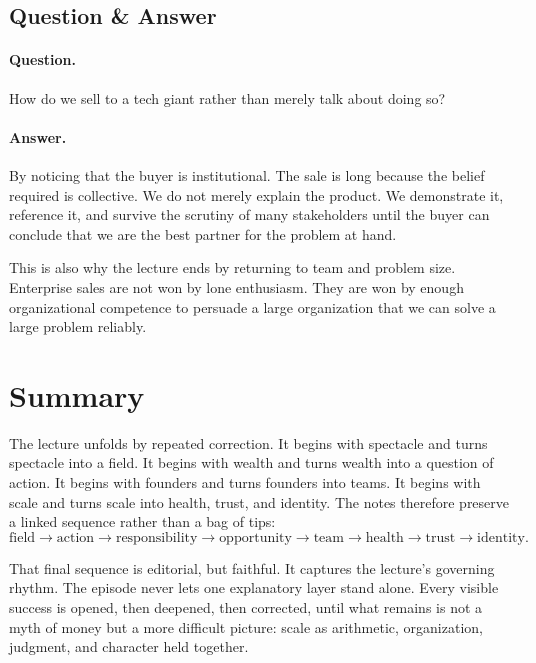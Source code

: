 \subsection{Question \& Answer}

\paragraph{Question.} How do we sell to a tech giant rather than merely talk about doing so?

\paragraph{Answer.} By noticing that the buyer is institutional. The sale is long because the belief required is collective. We do not merely explain the product. We demonstrate it, reference it, and survive the scrutiny of many stakeholders until the buyer can conclude that we are the best partner for the problem at hand.

This is also why the lecture ends by returning to team and problem size. Enterprise sales are not won by lone enthusiasm. They are won by enough organizational competence to persuade a large organization that we can solve a large problem reliably.

\section{Summary}

The lecture unfolds by repeated correction. It begins with spectacle and turns spectacle into a field. It begins with wealth and turns wealth into a question of action. It begins with founders and turns founders into teams. It begins with scale and turns scale into health, trust, and identity. The notes therefore preserve a linked sequence rather than a bag of tips:
\begin{equation}
\text{field}
\to
\text{action}
\to
\text{responsibility}
\to
\text{opportunity}
\to
\text{team}
\to
\text{health}
\to
\text{trust}
\to
\text{identity}.
\end{equation}

That final sequence is editorial, but faithful. It captures the lecture's governing rhythm. The episode never lets one explanatory layer stand alone. Every visible success is opened, then deepened, then corrected, until what remains is not a myth of money but a more difficult picture: scale as arithmetic, organization, judgment, and character held together.